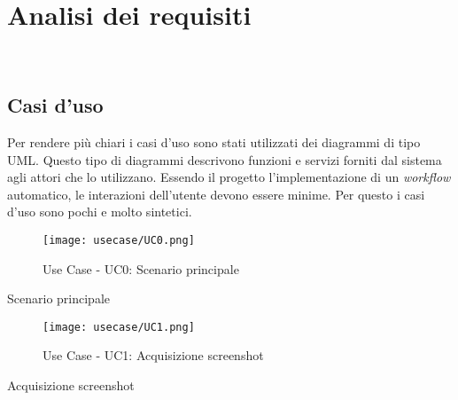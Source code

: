 \chapter{Analisi dei requisiti}
\label{cap:analisi-requisiti}

\\

\section{Casi d'uso}
Per rendere più chiari i casi d'uso sono stati utilizzati dei diagrammi di tipo \gls{UML}\glsfirstoccur.
Questo tipo di diagrammi descrivono funzioni e servizi forniti dal sistema agli attori che lo utilizzano.
Essendo il progetto l'implementazione di un \emph{\gls{workflow}} automatico, le interazioni dell'utente devono essere minime.
Per questo i casi d'uso sono pochi e molto sintetici.

\begin{figure}[!h] 
    \centering 
    \texttt{[image: usecase/UC0.png]} 
    \caption{Use Case - UC0: Scenario principale}
\end{figure}

\newpage

\begin{usecase}{0}{Scenario principale}
    \label{uc:scenario-principale}
\end{usecase}

\begin{figure}[!h] 
    \centering 
    \texttt{[image: usecase/UC1.png]} 
    \caption{Use Case - UC1: Acquisizione screenshot}
\end{figure}

\begin{usecase}{1}{Acquisizione screenshot} 
    \label{uc:acquisizione-screenshot} 
\end{usecase}
 
